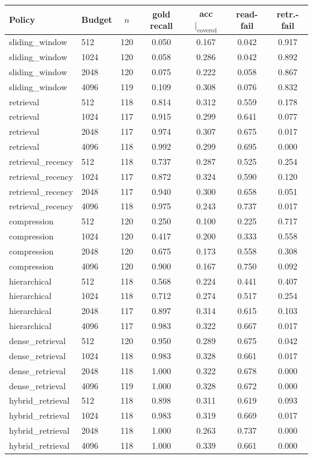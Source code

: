 \begin{tabular}{llccccc}
\toprule
Policy & Budget & $n$ & gold recall & acc$|_{\mathrm{covered}}$ & read-fail & retr.-fail \\
\midrule
sliding\_window & 512 & 120 & 0.050 & 0.167 & 0.042 & 0.917 \\
sliding\_window & 1024 & 120 & 0.058 & 0.286 & 0.042 & 0.892 \\
sliding\_window & 2048 & 120 & 0.075 & 0.222 & 0.058 & 0.867 \\
sliding\_window & 4096 & 119 & 0.109 & 0.308 & 0.076 & 0.832 \\
retrieval & 512 & 118 & 0.814 & 0.312 & 0.559 & 0.178 \\
retrieval & 1024 & 117 & 0.915 & 0.299 & 0.641 & 0.077 \\
retrieval & 2048 & 117 & 0.974 & 0.307 & 0.675 & 0.017 \\
retrieval & 4096 & 118 & 0.992 & 0.299 & 0.695 & 0.000 \\
retrieval\_recency & 512 & 118 & 0.737 & 0.287 & 0.525 & 0.254 \\
retrieval\_recency & 1024 & 117 & 0.872 & 0.324 & 0.590 & 0.120 \\
retrieval\_recency & 2048 & 117 & 0.940 & 0.300 & 0.658 & 0.051 \\
retrieval\_recency & 4096 & 118 & 0.975 & 0.243 & 0.737 & 0.017 \\
compression & 512 & 120 & 0.250 & 0.100 & 0.225 & 0.717 \\
compression & 1024 & 120 & 0.417 & 0.200 & 0.333 & 0.558 \\
compression & 2048 & 120 & 0.675 & 0.173 & 0.558 & 0.308 \\
compression & 4096 & 120 & 0.900 & 0.167 & 0.750 & 0.092 \\
hierarchical & 512 & 118 & 0.568 & 0.224 & 0.441 & 0.407 \\
hierarchical & 1024 & 118 & 0.712 & 0.274 & 0.517 & 0.254 \\
hierarchical & 2048 & 117 & 0.897 & 0.314 & 0.615 & 0.103 \\
hierarchical & 4096 & 117 & 0.983 & 0.322 & 0.667 & 0.017 \\
dense\_retrieval & 512 & 120 & 0.950 & 0.289 & 0.675 & 0.042 \\
dense\_retrieval & 1024 & 118 & 0.983 & 0.328 & 0.661 & 0.017 \\
dense\_retrieval & 2048 & 118 & 1.000 & 0.322 & 0.678 & 0.000 \\
dense\_retrieval & 4096 & 119 & 1.000 & 0.328 & 0.672 & 0.000 \\
hybrid\_retrieval & 512 & 118 & 0.898 & 0.311 & 0.619 & 0.093 \\
hybrid\_retrieval & 1024 & 118 & 0.983 & 0.319 & 0.669 & 0.017 \\
hybrid\_retrieval & 2048 & 118 & 1.000 & 0.263 & 0.737 & 0.000 \\
hybrid\_retrieval & 4096 & 118 & 1.000 & 0.339 & 0.661 & 0.000 \\
\bottomrule
\end{tabular}